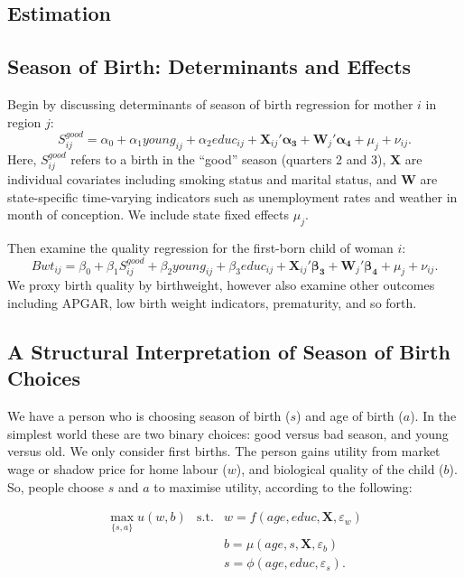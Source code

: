 \documentclass[a4paper, 11 pt]{article}
\theoremstyle{plain}
\begin{document}
\begin{spacing}{1.2}
\section{Estimation}
\subsection{Season of Birth: Determinants and Effects}

Begin by discussing determinants of season of birth regression for mother $i$ in 
region $j$:
\begin{equation}
\label{eqn:season}
S^{good}_{ij} = \alpha_0 + \alpha_1 young_{ij} + \alpha_2 educ_{ij}  + 
\mathbf{X}_{ij}'\mathbf{\alpha_3} + \mathbf{W}_{j}'\mathbf{\alpha_4} + \mu_j +\nu_{ij}. 
\end{equation}
Here, $S^{good}_{ij}$ refers to a birth in the ``good'' season (quarters 2 and 3),
$\mathbf{X}$ are individual covariates including smoking status and marital status,
and $\mathbf{W}$ are state-specific time-varying indicators such as unemployment
rates and weather in month of conception.  We include state fixed effects $\mu_j$.

Then examine the quality regression for the first-born child of woman $i$:
\begin{equation}
\label{eqn:quality}
Bwt_{ij} = \beta_0 + \beta_1 S^{good}_{ij} + \beta_2 young_{ij} + \beta_3 educ_{ij}  + 
\mathbf{X}_{ij}'\mathbf{\beta_3} + \mathbf{W}_{j}'\mathbf{\beta_4} + \mu_j +\nu_{ij}. 
\end{equation}
We proxy birth quality by birthweight, however also examine other outcomes 
including APGAR, low birth weight indicators, prematurity, and so forth.


\subsection{A Structural Interpretation of Season of Birth Choices}
We have a person who is choosing season of birth ($s$) and age of birth ($a$).  
In the simplest world these are two binary choices: good versus bad season, and 
young versus old.  We only consider first births.  The person gains utility from 
market wage or shadow price for home 
labour ($w$), and biological quality of the child ($b$).  So, people choose $s$ 
and $a$ to maximise utility, according to the following:


\begin{eqnarray}
\label{struc1}
\max_{\{s,a\}} u(w,b) &\text{s.t.}& w=f(age,educ,\mathbf{X},\varepsilon_w) \\ 
\label{struc2}
&& b=\mu(age,s,\mathbf{X},\varepsilon_b)                                  \\ 
\label{struc3}
&& s=\phi(age,educ,\varepsilon_s). 
\end{eqnarray}


\end{spacing}
\end{document}
